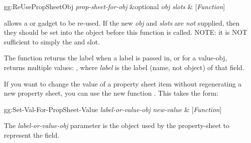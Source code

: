 \begin{programexample}
gg:ReUsePropSheetObj {\it prop-sheet-for-obj} \&optional {\it obj slots} & [{\it Function}]
\end{programexample}
 allows a  or
 gadget to be re-used.  If the
new {\it obj} and {\it slots} are {\it not} supplied, then they should be
set into the object before this function is called.  NOTE: it is NOT
sufficient to simply  the  and  slot.

The  function returns the label when
a label is passed in, or for a value-obj, returns multiple values:
, where {\it label} is the label (name, not object) of that
field.

If you want to change the value of a property sheet item without
regenerating a new property sheet, you can use the new function
.  This takes the form:
\begin{programexample}
gg:Set-Val-For-PropSheet-Value {\it label-or-value-obj new-value} & [{\it Function}]
\end{programexample}
The {\it label-or-value-obj} parameter is the object used by the
property-sheet to represent the field.


